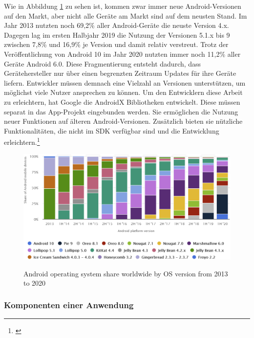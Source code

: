 Wie in Abbildung \ref{fig:android_version_fragmentation} zu sehen ist, kommen zwar immer neue Android-Versionen auf den Markt, aber nicht alle Geräte am Markt sind auf dem neusten Stand. Im Jahr 2013 nutzten noch {69,2\%} aller Android-Geräte die neuste Version 4.x. Dagegen lag im ersten Halbjahr 2019 die Nutzung der Versionen 5.1.x bis 9 zwischen {7,8\%} und {16,9\%} je Version und damit relativ verstreut. Trotz der Veröffentlichung von Android 10 im Jahr 2020 nutzten immer noch {11,2\%} aller Geräte Android 6.0. Diese Fragmentierung entsteht dadurch, dass Gerätehersteller nur über einen begrenzten Zeitraum Updates für ihre Geräte liefern. Entwickler müssen demnach eine Vielzahl an Versionen unterstützen, um möglichst viele Nutzer ansprechen zu können. Um den Entwicklern diese Arbeit zu erleichtern, hat Google die AndroidX Bibliotheken entwickelt. Diese müssen separat in das App-Projekt eingebunden werden. Sie ermöglichen die Nutzung neuer Funktionen auf älteren Android-Versionen. Zusätzlich bieten sie nützliche Funktionalitäten, die nicht im \gls{SDK} verfügbar sind und die Entwicklung erleichtern.\footnote{\cite[Vgl.][]{AndroidSupportLibrary2020}}

\begin{figure}[hbt]
    \centering
    \begin{minipage}[t]{.8\textwidth}
        \caption{Android operating system share worldwide by OS version from 2013 to 2020}
        \includegraphics[width=1\textwidth]{img/Android_Version_Fragmentation.PNG}\\
        \label{fig:android_version_fragmentation}
    \end{minipage}
\end{figure}

\subsubsection{Komponenten einer Anwendung}

